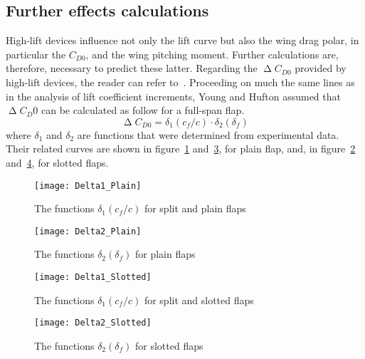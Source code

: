 \subsection{Further effects calculations}\label{subpar:DCD0}
High-lift devices influence not only the lift curve but also the wing drag polar, in particular the $C_{D0}$, and the wing pitching moment. Further calculations are, therefore, necessary to predict these latter. Regarding the $\upDelta C_{D0}$ provided by high-lift devices, the reader can refer to~\cite{Young:Flaps}. Proceeding on much the same lines as in the analysis of lift coefficient increments, Young and Hufton assumed that  $\upDelta C_D0$ can be calculated as follow for a full-span flap.
%
\begin{equation}
\upDelta C_{D0}=\delta_1\left(c_f/c\right)\cdot\delta_2\left(\delta_f\right)
\label{eqn:DeltaCD0FullSpan}
\end{equation}
%
where $\delta_1$ and $\delta_2$ are functions that were determined from experimental data. Their related curves are shown in figure~\ref{fig:Delta1Plain} and~\ref{fig:Delta2Plain}, for plain flap, and, in figure~\ref{fig:Delta1Slotted} and~\ref{fig:Delta2Slotted}, for slotted flaps.
%
\begin{figure}[H]
\centering
\texttt{[image: Delta1\_Plain]}
\caption{The functions $\delta_1\left(c_f/c\right)$ for split and plain flaps}
\label{fig:Delta1Plain}
\end{figure}
%
\begin{figure}[H]
\centering
\texttt{[image: Delta2\_Plain]}
\caption{The functions $\delta_2\left(\delta_f\right)$ for plain flaps}
\label{fig:Delta1Slotted}
\end{figure}
%
\begin{figure}[H]
\centering
\texttt{[image: Delta1\_Slotted]}
\caption{The functions $\delta_1\left(c_f/c\right)$ for split and slotted flaps}
\label{fig:Delta2Plain}
\end{figure}
%
\begin{figure}[H]
\centering
\texttt{[image: Delta2\_Slotted]}
\caption{The functions $\delta_2\left(\delta_f\right)$ for slotted flaps}
\label{fig:Delta2Slotted}
\end{figure}

